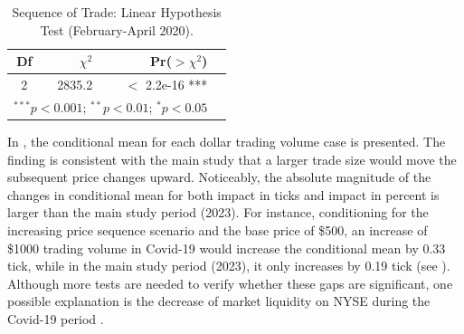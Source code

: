 \begin{table}[H]
    \centering
    \vspace{0.5em}
    \begin{tabular}{crrl}
        \toprule
        Df & $\chi^2$ & Pr($>$$\chi^2$) \\
        \midrule
         2 & 2835.2 & $<$ 2.2e-16 *** \\ 
         \bottomrule
        \multicolumn{3}{l}{$^{***}p < 0.001$; $^{**}p < 0.01$; $^{*}p < 0.05$}
    \end{tabular}
        \caption{Sequence of Trade: Linear Hypothesis Test (February-April 2020).}
    \label{tab:table-18}
\end{table}

In , the conditional mean for each dollar trading volume case is presented. The finding is consistent with the main study that a larger trade size would move the subsequent price changes upward. Noticeably, the absolute magnitude of the changes in conditional mean for both impact in ticks and impact in percent is larger than the main study period (2023). For instance, conditioning for the increasing price sequence scenario and the base price of \$500, an increase of \$1000 trading volume in Covid-19 would increase the conditional mean by 0.33 tick, while in the main study period (2023), it only increases by 0.19 tick (see ). Although more tests are needed to verify whether these gaps are significant, one possible explanation is the decrease of market liquidity on NYSE during the Covid-19 period \citep{chung&chuwonganant2023}. 






